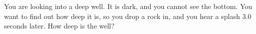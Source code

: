 You are looking into a deep well. It is dark, and you
cannot see the bottom. You want to find out how deep it is,
so you drop a rock in, and you hear a splash 3.0 seconds
later. How deep is the well? \answercheck
